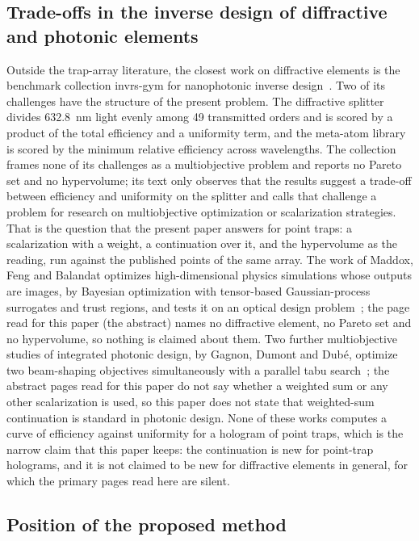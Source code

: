 \subsection{Trade-offs in the inverse design of diffractive and photonic elements}

Outside the trap-array literature, the closest work on diffractive elements is the benchmark collection invrs-gym for nanophotonic inverse design~\cite{invrsgym}. Two of its challenges have the structure of the present problem. The diffractive splitter divides 632.8~nm light evenly among 49 transmitted orders and is scored by a product of the total efficiency and a uniformity term, and the meta-atom library is scored by the minimum relative efficiency across wavelengths. The collection frames none of its challenges as a multiobjective problem and reports no Pareto set and no hypervolume; its text only observes that the results suggest a trade-off between efficiency and uniformity on the splitter and calls that challenge a problem for research on multiobjective optimization or scalarization strategies.
That is the question that the present paper answers for point traps: a scalarization with a weight, a continuation over it, and the hypervolume as the reading, run against the published points of the same array. The work of Maddox, Feng and Balandat optimizes high-dimensional physics simulations whose outputs are images, by Bayesian optimization with tensor-based Gaussian-process surrogates and trust regions, and tests it on an optical design problem~\cite{maddox}; the page read for this paper (the abstract) names no diffractive element, no Pareto set and no hypervolume, so nothing is claimed about them. Two further multiobjective studies of integrated photonic design, by Gagnon, Dumont and Dub\'e, optimize two beam-shaping objectives simultaneously with a parallel tabu search~\cite{gagnon2013a,gagnon2013b}; the abstract pages read for this paper do not say whether a weighted sum or any other scalarization is used, so this paper does not state that weighted-sum continuation is standard in photonic design. None of these works computes a curve of efficiency against uniformity for a hologram of point traps, which is the narrow claim that this paper keeps: the continuation is new for point-trap holograms, and it is not claimed to be new for diffractive elements in general, for which the primary pages read here are silent.

\subsection{Position of the proposed method}

